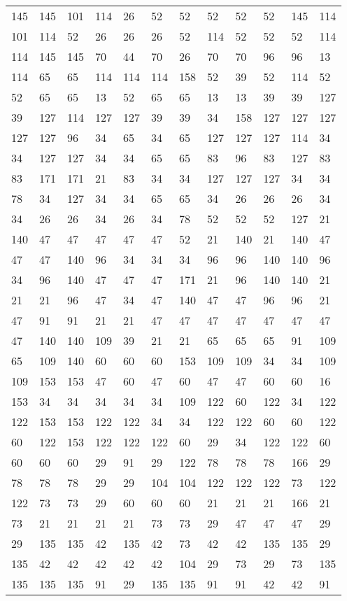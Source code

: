 \begin{longtable}{llllllllllll}
145 &145& 101 &114 &26& 52&52 &52& 52 &52 &145& 114\\
101 &114& 52 &26 &26& 26&52 &114& 52 &52 &52& 114\\
114 &145& 145 &70 &44& 70&26 &70& 70 &96 &96& 13\\
114 &65& 65 &114 &114& 114&158 &52& 39 &52 &114& 52\\
52 &65& 65 &13 &52& 65&65 &13& 13 &39 &39& 127\\
39 &127& 114 &127 &127& 39&39 &34& 158 &127 &127& 127\\
127 &127& 96 &34 &65& 34&65 &127& 127 &127 &114& 34\\
34 &127& 127 &34 &34& 65&65 &83& 96 &83 &127& 83\\
83 &171& 171 &21 &83& 34&34 &127& 127 &127 &34& 34\\
78 &34& 127 &34 &34& 65&65 &34& 26 &26 &26& 34\\
34 &26& 26 &34 &26& 34&78 &52& 52 &52 &127& 21\\
140 &47& 47 &47 &47& 47&52 &21& 140 &21 &140& 47\\
47 &47& 140 &96 &34& 34&34 &96& 96 &140 &140& 96\\
34 &96& 140 &47 &47& 47&171 &21& 96 &140 &140& 21\\
21 &21& 96 &47 &34& 47&140 &47& 47 &96 &96& 21\\
47 &91& 91 &21 &21& 47&47 &47& 47 &47 &47& 47\\
47 &140& 140 &109 &39& 21&21 &65& 65 &65 &91& 109\\
65 &109& 140 &60 &60& 60&153 &109& 109 &34 &34& 109\\
109 &153& 153 &47 &60& 47&60 &47& 47 &60 &60& 16\\
153 &34& 34 &34 &34& 34&109 &122& 60 &122 &34& 122\\
122 &153& 153 &122 &122& 34&34 &122& 122 &60 &60& 122\\
60 &122& 153 &122 &122& 122&60 &29& 34 &122 &122& 60\\
60 &60& 60 &29 &91& 29&122 &78& 78 &78 &166& 29\\
78 &78& 78 &29 &29& 104&104 &122& 122 &122 &73& 122\\
122 &73& 73 &29 &60& 60&60 &21& 21 &21 &166& 21\\
73 &21& 21 &21 &21& 73&73 &29& 47 &47 &47& 29\\
29 &135& 135 &42 &135& 42&73 &42& 42 &135 &135& 29\\
135 &42& 42 &42 &42& 42&104 &29& 73 &29 &73& 135\\
135 &135& 135 &91 &29& 135&135 &91& 91 &42 &42& 91\\

\end{longtable}
